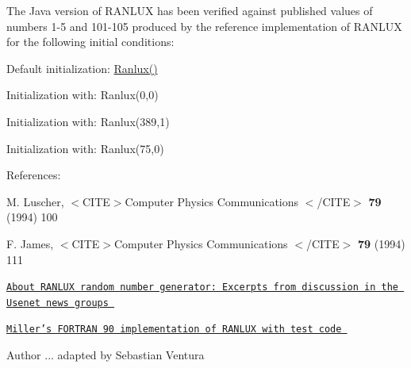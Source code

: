 The Java version of {\ttfamily R\-A\-N\-L\-U\-X} has been verified against published values of numbers 1-\/5 and 101-\/105 produced by the reference implementation of {\ttfamily R\-A\-N\-L\-U\-X} for the following initial conditions\-:


\begin{DoxyItemize}
\item Default initialization\-: {\ttfamily \hyperlink{classnet_1_1sf_1_1jclec_1_1util_1_1random_1_1_ranlux_ad4bc0fb1b59447d507ece8cc4383236e}{Ranlux()}} 
\item Initialization with\-: {\ttfamily Ranlux(0,0)} 
\item Initialization with\-: {\ttfamily Ranlux(389,1)} 
\item Initialization with\-: {\ttfamily Ranlux(75,0)} 
\end{DoxyItemize}

References\-: 
\begin{DoxyItemize}
\item M. Luscher, $<$\-C\-I\-T\-E$>$Computer Physics Communications $<$/\-C\-I\-T\-E$>$ {\bfseries 79 } (1994) 100 
\item F. James, $<$\-C\-I\-T\-E$>$Computer Physics Communications $<$/\-C\-I\-T\-E$>$ {\bfseries 79 } (1994) 111 
\item \href{http://www.mpa-garching.mpg.de/~tomek/htmls/refs/ranlux.about.html}{\tt About {\ttfamily R\-A\-N\-L\-U\-X} random number generator\-: Excerpts from discussion in the Usenet news groups } 
\item \href{http://www.mpa-garching.mpg.de/~tomek/htmls/refs/ranlux.f90_2.html}{\tt Miller's F\-O\-R\-T\-R\-A\-N 90 implementation of {\ttfamily R\-A\-N\-L\-U\-X} with test code }


\end{DoxyItemize}

\begin{DoxyAuthor}{Author}
... adapted by Sebastian Ventura 
\end{DoxyAuthor}



